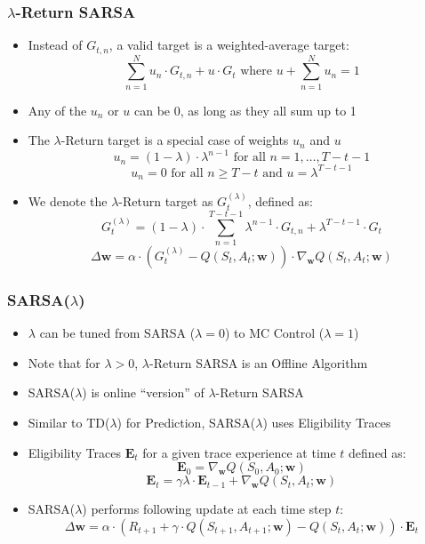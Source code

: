 \documentclass[handout]{beamer}
\begin{document}
\begin{frame}
\frametitle{$\lambda$-Return SARSA}
\pause
\begin{itemize}[<+->]
\item Instead of $G_{t,n}$, a valid target is a weighted-average target:
$$\sum_{n=1}^N u_n \cdot G_{t,n} + u \cdot G_t \text{ where } u + \sum_{n=1}^N u_n = 1$$
\item Any of the $u_n$ or $u$ can be 0, as long as they all sum up to 1
\item The $\lambda$-Return target is a special case of weights $u_n$ and $u$
$$u_n = (1 - \lambda) \cdot \lambda^{n-1} \text{ for all } n = 1, \ldots, T-t-1$$
$$u_n = 0 \text{ for all } n \geq T-t \text{ and } u = \lambda^{T-t-1}$$
\item We denote the $\lambda$-Return target as $G_t^{(\lambda)}$, defined as:
$$G_t^{(\lambda)} = (1-\lambda) \cdot \sum_{n=1}^{T-t-1} \lambda^{n-1} \cdot G_{t,n} + \lambda^{T-t-1} \cdot G_t$$
$$\Delta \bm{w} = \alpha \cdot (G_t^{(\lambda)} - Q(S_t, A_t; \bm{w})) \cdot \nabla_{\bm{w}} Q(S_t, A_t; \bm{w})$$
\end{itemize}
\end{frame}

\begin{frame}
\frametitle{SARSA($\lambda$)}
\pause
\begin{itemize}[<+->]
\item $\lambda$ can be tuned from SARSA ($\lambda=0$) to MC Control ($\lambda=1$)
\item Note that for $\lambda > 0$, $\lambda$-Return SARSA is an Offline Algorithm
\item SARSA($\lambda$) is online ``version'' of $\lambda$-Return SARSA
\item Similar to TD($\lambda$) for Prediction, SARSA($\lambda$) uses Eligibility Traces
 \item Eligibility Traces $\bm{E}_t$ for a given trace experience at time $t$ defined as:
$$\bm{E}_0 = \nabla_{\bm{w}} Q(S_0, A_0; \bm{w})$$
$$\bm{E}_t = \gamma \lambda \cdot \bm{E}_{t-1} + \nabla_{\bm{w}} Q(S_t,A_t;\bm{w})$$
\item SARSA($\lambda$) performs following update at each time step $t$:
$$\Delta \bm{w} = \alpha \cdot (R_{t+1} + \gamma \cdot Q(S_{t+1},A_{t+1};\bm{w}) - Q(S_t,A_t;\bm{w})) \cdot \bm{E}_t$$
\end{itemize}
\end{frame}
\end{document}
